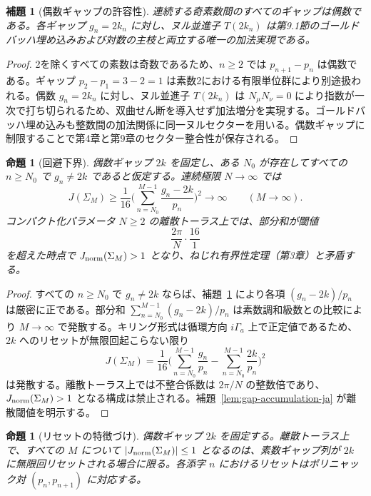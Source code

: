 \documentclass[dvipdfmx,a4paper]{article}
\newtheorem{lemma}[theorem]{補題}
\newtheorem{proposition}[theorem]{命題}
\theoremstyle{definition}
\theoremstyle{remark}
\newcommand{\Jnorm}{J_{\rm norm}}
\begin{document}
\begin{lemma}[偶数ギャップの許容性]
\label{lem:even-gap-admissible-ja}
連続する奇素数間のすべてのギャップは偶数である。各ギャップ $g_n = 2k_n$ に対し、ヌル並進子 $T(2k_n)$ は第9.1節のゴールドバッハ埋め込みおよび対数の主枝と両立する唯一の加法実現である。
\end{lemma}

\begin{proof}
2を除くすべての素数は奇数であるため、$n \geq 2$ では $p_{n+1} - p_n$ は偶数である。ギャップ $p_2 - p_1 = 3 - 2 = 1$ は素数2における有限単位群により別途扱われる。偶数 $g_n = 2k_n$ に対し、ヌル並進子 $T(2k_n)$ は $N_\mu N_\nu = 0$ により指数が一次で打ち切られるため、双曲せん断を導入せず加法増分を実現する。ゴールドバッハ埋め込みも整数間の加法関係に同一ヌルセクターを用いる。偶数ギャップに制限することで第4章と第9章のセクター整合性が保存される。
\end{proof}

\begin{proposition}[回避下界]
\label{prop:gap-avoidance-ja}
偶数ギャップ $2k$ を固定し、ある $N_0$ が存在してすべての $n \geq N_0$ で $g_n \neq 2k$ であると仮定する。連続極限 $N \to \infty$ では
\[
J(\Sigma_M) \geq \frac{1}{16} \Biggl( \sum_{n=N_0}^{M-1} \frac{g_n - 2k}{p_n} \Biggr)^2 \to \infty \qquad (M \to \infty).
\]
コンパクト化パラメータ $N \geq 2$ の離散トーラス上では、部分和が閾値
\[
\frac{2\pi}{N} \cdot \frac{16}{1}
\]
を超えた時点で $\Jnorm(\Sigma_M) > 1$ となり、ねじれ有界性定理（第3章）と矛盾する。
\end{proposition}

\begin{proof}
すべての $n \geq N_0$ で $g_n \neq 2k$ ならば、補題~\ref{lem:even-gap-admissible-ja} により各項 $(g_n - 2k)/p_n$ は厳密に正である。部分和 $\sum_{n=N_0}^{M-1} (g_n - 2k)/p_n$ は素数調和級数との比較により $M \to \infty$ で発散する。キリング形式は循環方向 $i\Gamma_a$ 上で正定値であるため、$2k$ へのリセットが無限回起こらない限り
\[
J(\Sigma_M) = \frac{1}{16} \Biggl( \sum_{n=N_0}^{M-1} \frac{g_n}{p_n} - \sum_{n=N_0}^{M-1} \frac{2k}{p_n} \Biggr)^2
\]
は発散する。離散トーラス上では不整合係数は $2\pi/N$ の整数倍であり、$\Jnorm(\Sigma_M) > 1$ となる構成は禁止される。補題~\ref{lem:gap-accumulation-ja} が離散閾値を明示する。
\end{proof}

\begin{proposition}[リセットの特徴づけ]
\label{prop:gap-reset-ja}
偶数ギャップ $2k$ を固定する。離散トーラス上で、すべての $M$ について $|\Jnorm(\Sigma_M)| \leq 1$ となるのは、素数ギャップ列が $2k$ に無限回リセットされる場合に限る。各添字 $n$ におけるリセットはポリニャック対 $(p_n, p_{n+1})$ に対応する。
\end{proposition}
\end{document}
